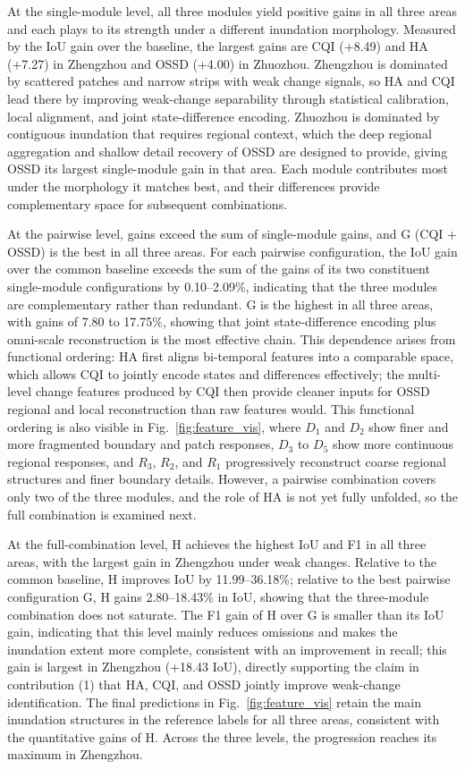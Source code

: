 \documentclass[authoryear,preprint,12pt]{elsarticle}
\begin{document}
At the single-module level, all three modules yield positive gains in all three areas and each plays to its strength under a different inundation morphology. Measured by the IoU gain over the baseline, the largest gains are CQI (+8.49) and HA (+7.27) in Zhengzhou and OSSD (+4.00) in Zhuozhou. Zhengzhou is dominated by scattered patches and narrow strips with weak change signals, so HA and CQI lead there by improving weak-change separability through statistical calibration, local alignment, and joint state-difference encoding. Zhuozhou is dominated by contiguous inundation that requires regional context, which the deep regional aggregation and shallow detail recovery of OSSD are designed to provide, giving OSSD its largest single-module gain in that area. Each module contributes most under the morphology it matches best, and their differences provide complementary space for subsequent combinations.

At the pairwise level, gains exceed the sum of single-module gains, and G (CQI + OSSD) is the best in all three areas. For each pairwise configuration, the IoU gain over the common baseline exceeds the sum of the gains of its two constituent single-module configurations by 0.10--2.09\%, indicating that the three modules are complementary rather than redundant. G is the highest in all three areas, with gains of 7.80 to 17.75\%, showing that joint state-difference encoding plus omni-scale reconstruction is the most effective chain. This dependence arises from functional ordering: HA first aligns bi-temporal features into a comparable space, which allows CQI to jointly encode states and differences effectively; the multi-level change features produced by CQI then provide cleaner inputs for OSSD regional and local reconstruction than raw features would. This functional ordering is also visible in Fig.~\ref{fig:feature_vis}, where \(D_1\) and \(D_2\) show finer and more fragmented boundary and patch responses, \(D_3\) to \(D_5\) show more continuous regional responses, and \(R_3\), \(R_2\), and \(R_1\) progressively reconstruct coarse regional structures and finer boundary details. However, a pairwise combination covers only two of the three modules, and the role of HA is not yet fully unfolded, so the full combination is examined next.

At the full-combination level, H achieves the highest IoU and F1 in all three areas, with the largest gain in Zhengzhou under weak changes. Relative to the common baseline, H improves IoU by 11.99--36.18\%; relative to the best pairwise configuration G, H gains 2.80--18.43\% in IoU, showing that the three-module combination does not saturate. The F1 gain of H over G is smaller than its IoU gain, indicating that this level mainly reduces omissions and makes the inundation extent more complete, consistent with an improvement in recall; this gain is largest in Zhengzhou (+18.43 IoU), directly supporting the claim in contribution (1) that HA, CQI, and OSSD jointly improve weak-change identification. The final predictions in Fig.~\ref{fig:feature_vis} retain the main inundation structures in the reference labels for all three areas, consistent with the quantitative gains of H. Across the three levels, the progression reaches its maximum in Zhengzhou.
\end{document}
